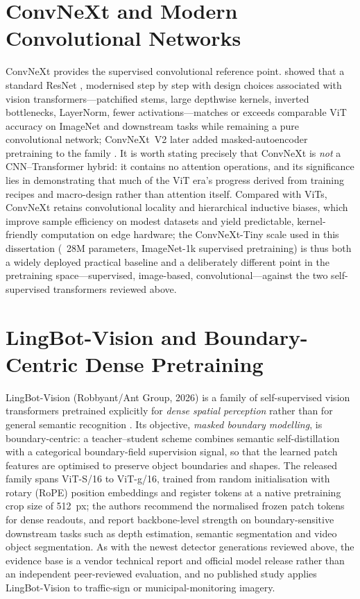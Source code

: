 \section{ConvNeXt and Modern Convolutional Networks}
\label{sec:lr-convnext}

ConvNeXt provides the supervised convolutional reference point. \citet{liu2022convnet} showed that a standard ResNet \citep{he2016deep}, modernised step by step with design choices associated with vision transformers---patchified stems, large depthwise kernels, inverted bottlenecks, LayerNorm, fewer activations---matches or exceeds comparable ViT accuracy on ImageNet and downstream tasks while remaining a pure convolutional network; ConvNeXt~V2 later added masked-autoencoder pretraining to the family \citep{woo2023convnextv2}. It is worth stating precisely that ConvNeXt is \emph{not} a CNN--Transformer hybrid: it contains no attention operations, and its significance lies in demonstrating that much of the ViT era's progress derived from training recipes and macro-design rather than attention itself. Compared with ViTs, ConvNeXt retains convolutional locality and hierarchical inductive biases, which improve sample efficiency on modest datasets and yield predictable, kernel-friendly computation on edge hardware; the ConvNeXt-Tiny scale used in this dissertation (~28M parameters, ImageNet-1k supervised pretraining) is thus both a widely deployed practical baseline and a deliberately different point in the pretraining space---supervised, image-based, convolutional---against the two self-supervised transformers reviewed above.

\section{LingBot-Vision and Boundary-Centric Dense Pretraining}
\label{sec:lr-lingbot}

LingBot-Vision (Robbyant/Ant Group, 2026) is a family of self-supervised vision transformers pretrained explicitly for \emph{dense spatial perception} rather than for general semantic recognition \citep{fu2026lingbot}. Its objective, \emph{masked boundary modelling}, is boundary-centric: a teacher--student scheme combines semantic self-distillation with a categorical boundary-field supervision signal, so that the learned patch features are optimised to preserve object boundaries and shapes. The released family spans ViT-S/16 to ViT-g/16, trained from random initialisation with rotary (RoPE) position embeddings and register tokens at a native pretraining crop size of 512~px; the authors recommend the normalised frozen patch tokens for dense readouts, and report backbone-level strength on boundary-sensitive downstream tasks such as depth estimation, semantic segmentation and video object segmentation. As with the newest detector generations reviewed above, the evidence base is a vendor technical report and official model release rather than an independent peer-reviewed evaluation, and no published study applies LingBot-Vision to traffic-sign or municipal-monitoring imagery.

